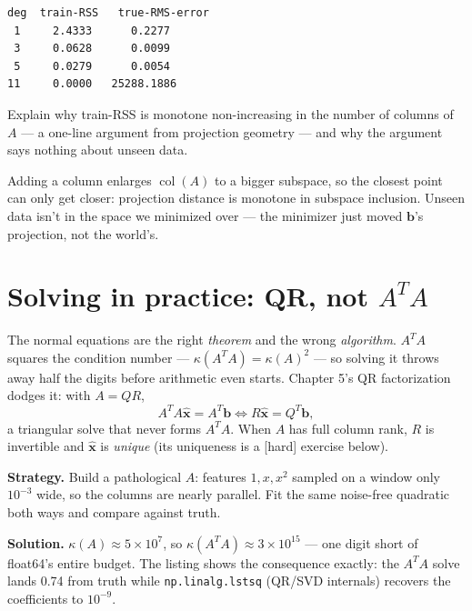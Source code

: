 \begin{lstlisting}[caption={Output of the overfit demo. Notice training
RSS decreases monotonically to zero --- projections only get closer ---
while the true error turns around and explodes at degree 11, where $A$
has a column per data point.}]
deg  train-RSS   true-RMS-error
 1     2.4333      0.2277
 3     0.0628      0.0099
 5     0.0279      0.0054
11     0.0000   25288.1886
\end{lstlisting}

\begin{exercise}[hard]
Explain why train-RSS is monotone non-increasing in the number of columns
of $A$ --- a one-line argument from projection geometry --- and why the
argument says nothing about unseen data.
\begin{solution}
Adding a column enlarges $\operatorname{col}(A)$ to a bigger subspace, so
the closest point can only get closer: projection distance is monotone in
subspace inclusion. Unseen data isn't in the space we minimized over ---
the minimizer just moved $\mathbf b$'s projection, not the world's.
\end{solution}
\end{exercise}

\section{Solving in practice: QR, not \texorpdfstring{$A^{T}A$}{A^TA}}\label{sec:lstsq-qr}

The normal equations are the right \emph{theorem} and the wrong
\emph{algorithm}. $A^{T}A$ squares the condition number
--- $\kappa(A^{T}A)=\kappa(A)^{2}$ --- so solving it throws away half the
digits before arithmetic even starts. Chapter 5's QR factorization dodges
it: with $A=QR$,
\[
A^{T}A\hat{\mathbf x}=A^{T}\mathbf b
\iff R\hat{\mathbf x}=Q^{T}\mathbf b ,
\]
a triangular solve that never forms $A^{T}A$. When $A$ has full column
rank, $R$ is invertible and $\hat{\mathbf x}$ is \emph{unique}
(its uniqueness is a [hard] exercise below).

\begin{example}\label{ex:qrsolve}
\textbf{Strategy.} Build a pathological $A$: features $1,x,x^{2}$ sampled
on a window only $10^{-3}$ wide, so the columns are nearly parallel. Fit
the same noise-free quadratic both ways and compare against truth.

\textbf{Solution.} $\kappa(A)\approx5\times10^{7}$, so
$\kappa(A^{T}A)\approx3\times10^{15}$ --- one digit short of float64's
entire budget. The listing shows the consequence exactly: the $A^{T}A$
solve lands 0.74 from truth while \texttt{np.linalg.lstsq} (QR/SVD
internals) recovers the coefficients to $10^{-9}$.
\end{example}

